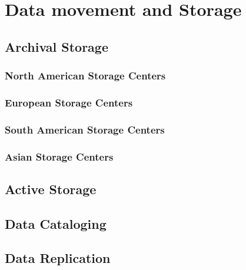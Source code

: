 %
\chapter{Data movement and Storage } 

\section{Archival Storage}

\subsection{North American Storage Centers}

\subsection{European Storage Centers}

\subsection{South American Storage Centers}

\subsection{Asian Storage Centers}

\section{Active Storage}

\section{Data Cataloging}

\section{Data Replication}

